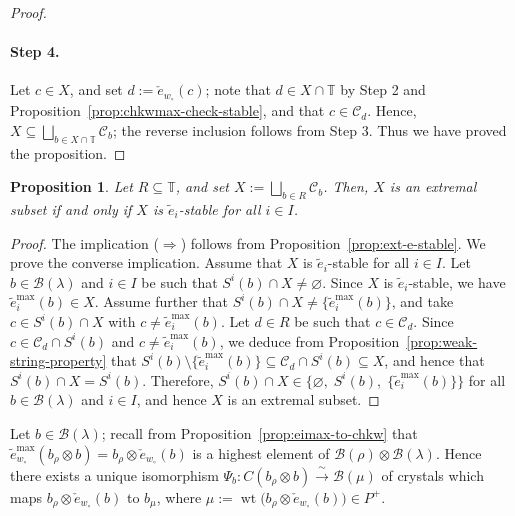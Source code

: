 \documentclass[reqno]{amsart}
\newtheorem{proposition}[theorem]{Proposition}
\theoremstyle{definition}
\theoremstyle{remark}
\numberwithin{equation}{section}
\newcommand{\B}{\mathcal{B}}
\newcommand{\wt}{\operatorname{wt}}
\newcommand{\Tfix}{\mathbb{T}}
\newcommand{\wo}{w_\circ}
\newcommand{\te}{\tilde e}
\newcommand{\chke}{\check e}
\newcommand{\Bl}{\B(\lambda)}
\begin{document}
\begin{proof}
		\paragraph{\bf Step 4.}
		Let $c\in X$,
		and set $d:=\chke_{\wo}(c)$;
		note that $d\in X\cap\Tfix$ by Step 2 and Proposition~\ref{prop:chkwmax-check-stable},
		and that $c\in\mathcal{C}_d$.
		Hence, $X\subseteq\bigsqcup_{b\in X\cap\Tfix}\mathcal{C}_b$;
		the reverse inclusion follows from Step 3.
		Thus we have proved the proposition.
	\end{proof}
	
	\begin{proposition}\label{prop:union-of-classes}
		Let $R\subseteq\Tfix$,
		and set $X:=\bigsqcup_{b\in R}\mathcal{C}_{b}$.
		Then, $X$ is an extremal subset if and only if $X$ is $\te_i$-stable for all $i\in I$.
	\end{proposition}
	\begin{proof}
		The implication ($\Rightarrow$) follows from Proposition~\ref{prop:ext-e-stable}.
		We prove the converse implication.
		Assume that $X$ is $\te_i$-stable for all $i\in I$.
		Let $b\in\Bl$ and $i\in I$ be such that $S^i(b)\cap X\ne\varnothing$.
		Since $X$ is $\te_i$-stable, we have $\te_i^{\max}(b)\in X$.
		Assume further that $S^i(b)\cap X\ne\{\te_i^{\max}(b)\}$,
		and take $c\in S^i(b)\cap X$ with $c\ne\te_i^{\max}(b)$.
		Let $d\in R$ be such that $c\in\mathcal{C}_d$.
		Since $c\in\mathcal{C}_d\cap S^i(b)$ and $c\ne\te_i^{\max}(b)$,
		we deduce from Proposition~\ref{prop:weak-string-property} that
		$S^i(b)\setminus\{\te_i^{\max}(b)\}\subseteq\mathcal{C}_d\cap S^i(b)\subseteq X$,
		and hence that $S^i(b)\cap X=S^i(b)$.
		Therefore,
		$S^i(b)\cap X\in\{\varnothing,\;S^i(b),\;\{\te_i^{\max}(b)\}\}$
		for all $b\in\Bl$ and $i\in I$,
		and hence $X$ is an extremal subset.
	\end{proof}
	
	Let $b\in\Bl$;
	recall from Proposition~\ref{prop:eimax-to-chkw} that
	$\te_{\wo}^{\max}(b_\rho\otimes b)=b_\rho\otimes\chke_{\wo}(b)$
	is a highest element of $\B(\rho)\otimes\Bl$.
	Hence there exists a unique isomorphism
	$\Psi_b:C(b_\rho\otimes b)\xrightarrow{\ \sim\ }\B(\mu)$ of crystals
	which maps $b_\rho\otimes\chke_{\wo}(b)$ to $b_\mu$,
	where $\mu:=\wt\bigl(b_\rho\otimes\chke_{\wo}(b)\bigr)\in P^+$.
\end{document}
